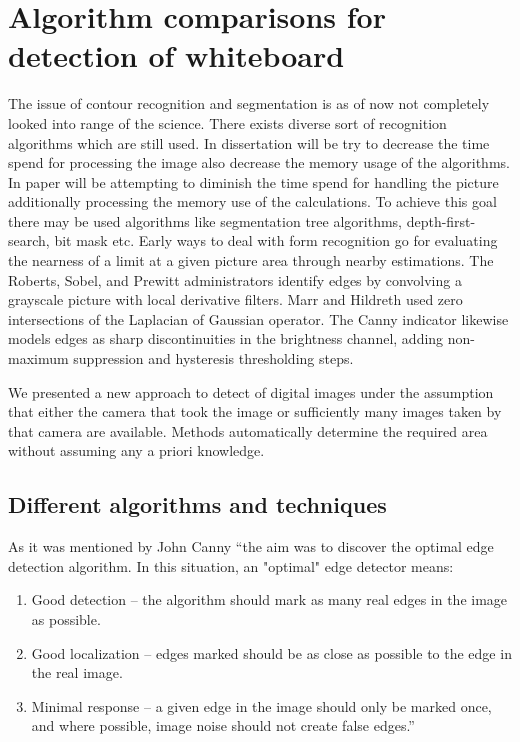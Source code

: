 \chapter{Algorithm comparisons for detection of whiteboard}

The issue of contour recognition and segmentation is as of now not completely looked into range of the science. There exists diverse sort of recognition algorithms which are still used. In dissertation will be try to decrease the time spend for processing the image also decrease the memory usage of the algorithms. In paper will be attempting to diminish the time spend for handling the picture additionally processing the memory use of the calculations. To achieve this goal there may be used algorithms like segmentation tree algorithms, depth-first-search, bit mask etc. Early ways to deal with form recognition go for evaluating the nearness of a limit at a given picture area through nearby estimations. The Roberts, Sobel, and Prewitt administrators identify edges by convolving a grayscale picture with local derivative filters.\cite{Argyle} Marr and Hildreth used zero intersections of the Laplacian of Gaussian operator. The Canny indicator likewise models edges as sharp discontinuities in the brightness channel, adding non-maximum suppression and hysteresis thresholding steps.\cite{Pooja} 

We presented a new approach to detect of digital images under the assumption that either the camera that took the image or sufficiently many images taken by that camera are available. Methods automatically determine the required area without assuming any a priori knowledge. 

\section{Different algorithms and techniques}
As it was mentioned by John Canny ``the aim was to discover the optimal edge detection algorithm. In this situation, an "optimal" edge detector means:
\begin{enumerate}
\item Good detection – the algorithm should mark as many real edges in the image as possible.
\item Good localization – edges marked should be as close as possible to the edge in the real image.
\item Minimal response – a given edge in the image should only be marked once, and where possible, image noise should not create false edges.'' \cite{John}
\end{enumerate}

